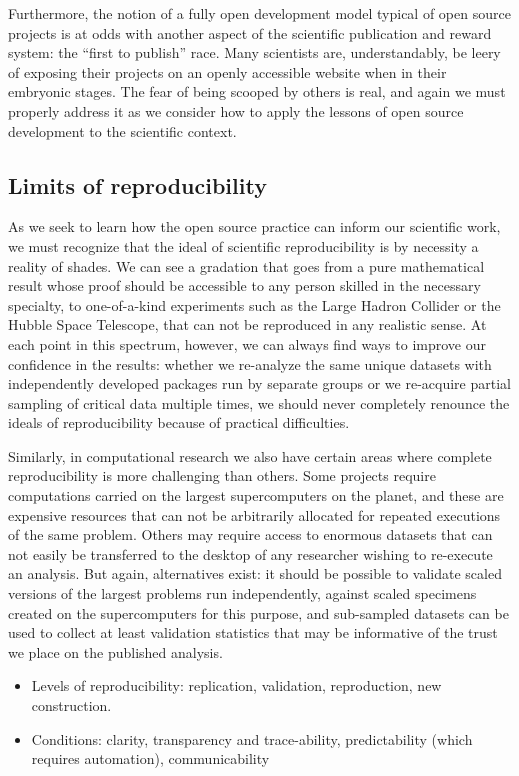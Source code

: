\documentclass[ChapterTOCs,krantz2]{krantz} %
\begin{document}
Furthermore, the notion of a fully open development model typical
of open source projects is at odds with another aspect of the
scientific publication and reward system: the ``first
to publish'' race. Many scientists are, understandably,
be leery of exposing their projects on an openly accessible website
when in their embryonic stages. The fear of being scooped by others
is real, and again we must properly address it as we consider
how to apply the lessons of open source development to the scientific
context.


\subsection{Limits of reproducibility}

As we seek to learn how the open source practice can inform our scientific
work, we must recognize that the ideal of scientific reproducibility
is by necessity a reality of shades. We can see a gradation that goes
from a pure mathematical result whose proof should be accessible to
any person skilled in the necessary specialty, to one-of-a-kind experiments
such as the Large Hadron Collider or the Hubble Space Telescope, that
can not be reproduced in any realistic sense. At each point in this
spectrum, however, we can always find ways to improve our confidence
in the results: whether we re-analyze the same unique datasets with
independently developed packages run by separate groups or we re-acquire
partial sampling of critical data multiple times, we should never
completely renounce the ideals of reproducibility because of practical
difficulties.

Similarly, in computational research we also have certain areas where
complete reproducibility is more challenging than others. Some projects
require computations carried on the largest supercomputers on the
planet, and these are expensive resources that can not be arbitrarily
allocated for repeated executions of the same problem. Others may
require access to enormous datasets that can not easily be transferred
to the desktop of any researcher wishing to re-execute an analysis.
But again, alternatives exist: it should be possible to validate scaled
versions of the largest problems run independently, against scaled
specimens created on the supercomputers for this purpose, and
sub-sampled datasets can be used to collect at least validation statistics
that may be informative of the trust we place on the published analysis.

\begin{itemize}
\item Levels of reproducibility: replication, validation, reproduction,
new construction.
\item Conditions: clarity, transparency and trace-ability, predictability
(which requires automation), communicability
\end{itemize}
\end{document}
